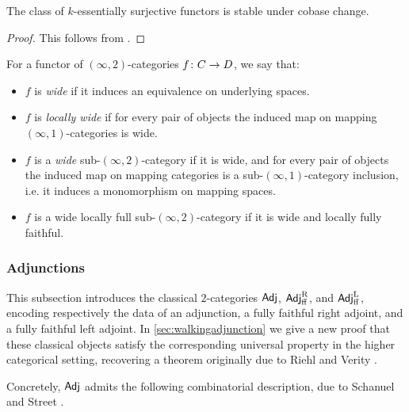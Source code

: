 \documentclass[a4paper,reqno,twoside]{amsart}
\begin{document}
\begin{proposition}\label{prop:essurjcobase}
	The class of $k$-essentially surjective functors is stable under cobase change.
\end{proposition}
\begin{proof}
	This follows from \cite[Theorem B.4.1]{Soerg}.
\end{proof}

\begin{definition}\label{def:typeofsubcat}
	For a functor of $(\infty,2)$-categories $f \colon \relax{C} \to \relax{D}$, we say that:
	\begin{itemize}
		\item $f$ is \emph{wide} if it induces an equivalence on underlying spaces.
		\item $f$ is \emph{locally wide} if for every pair of objects the induced map on mapping $(\infty,1)$-categories is wide.
		\item $f$ is a \emph{wide} sub-$(\infty,2)$-category if it is wide, and for every pair of objects the induced map on mapping categories is a sub-$(\infty,1)$-category inclusion, i.e. it induces a monomorphism on mapping spaces.
		\item $f$ is a wide locally full sub-$(\infty,2)$-category if it is wide and locally fully faithful.
	\end{itemize}
\end{definition}

\subsubsection{Adjunctions}
This subsection introduces the classical $2$-categories $\mathsf{Adj}$, $\mathsf{Adj}^{\operatorname{R}}_{\mathrm{ff}}$, and $\mathsf{Adj}^{\operatorname{L}}_{\mathrm{ff}}$, encoding respectively the data of an adjunction, a fully faithful right adjoint, and a fully faithful left adjoint. In \cref{sec:walkingadjunction} we give a new proof that these classical objects satisfy the corresponding universal property in the higher categorical setting, recovering a theorem originally due to Riehl and Verity \cite{RiehlVerity2016FormalTheoryMonads}.

Concretely, $\mathsf{Adj}$ admits the following combinatorial description, due to Schanuel and Street \cite{SchanuelStreet1986FreeAdjunction}.
\end{document}
